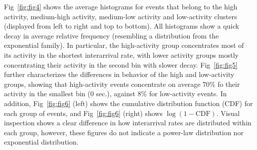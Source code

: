 



Fig~\ref{fig:fig4} shows the average histograms for events that
belong to the high activity, medium-high activity, medium-low activity
and low-activity clusters (displayed from left to right and top to
bottom). All histograms show a quick decay in average relative
frequency (resembling a distribution from the exponential family). In
particular, the high-activity group concentrates most of its activity
in the shortest interarrival rate, with lower activity groups mostly
concentrating their activity in the second bin with slower
decay. Fig~\ref{fig:fig5} further characterizes the differences in
behavior of the high and low-activity groups, showing that
high-activity events concentrate on average $70\%$ fo their activity
in the smallest bin ($0$ sec.), against $8\%$ for low-activity
events. In addition, Fig~\ref{fig:fig6} (left) shows the cumulative
distribution function (CDF) for each group of events, and
Fig~\ref{fig:fig6} (right) shows $\log{(1 - \mathrm{CDF})}$. Visual
inspection shows a clear difference in how interarrival rates are
distributed within each group, however, these figures do not indicate a
power-law distribution nor exponential distribution.%


